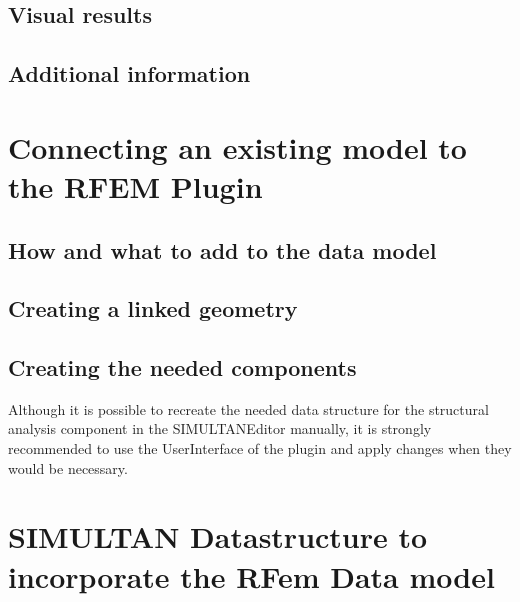 \documentclass[letterpaper,10pt,english]{jupyterBook}
\begin{document}
\section{Visual results}
\label{\detokenize{Results_of_the_simulation:visual-results}}

\section{Additional information}
\label{\detokenize{Results_of_the_simulation:additional-information}}
\sphinxstepscope


\chapter{Connecting an existing model to the RFEM Plugin}
\label{\detokenize{Connecting_an_existing_model_to_the_RFem_Plugin:connecting-an-existing-model-to-the-rfem-plugin}}\label{\detokenize{Connecting_an_existing_model_to_the_RFem_Plugin:id1}}\label{\detokenize{Connecting_an_existing_model_to_the_RFem_Plugin::doc}}

\section{How and what to add to the data model}
\label{\detokenize{Connecting_an_existing_model_to_the_RFem_Plugin:how-and-what-to-add-to-the-data-model}}

\section{Creating a linked geometry}
\label{\detokenize{Connecting_an_existing_model_to_the_RFem_Plugin:creating-a-linked-geometry}}

\section{Creating the needed components}
\label{\detokenize{Connecting_an_existing_model_to_the_RFem_Plugin:creating-the-needed-components}}
\sphinxAtStartPar
Although it is possible to recreate the needed data structure for the structural analysis component in the
SIMULTAN\sphinxhyphen{}Editor manually, it is strongly recommended to use the User\sphinxhyphen{}Interface of the plugin and apply changes when they
would be necessary.

\sphinxstepscope


\chapter{SIMULTAN Datastructure to incorporate the RFem Data model}
\label{\detokenize{SIMULTAN_Datastructure_to_incorporate_the_RFem_Data_model:simultan-datastructure-to-incorporate-the-rfem-data-model}}\label{\detokenize{SIMULTAN_Datastructure_to_incorporate_the_RFem_Data_model:id1}}\label{\detokenize{SIMULTAN_Datastructure_to_incorporate_the_RFem_Data_model::doc}}
\sphinxstepscope
\end{document}
